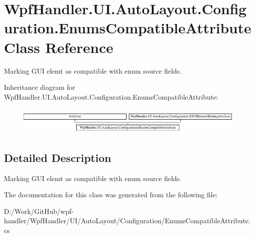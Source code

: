 \hypertarget{class_wpf_handler_1_1_u_i_1_1_auto_layout_1_1_configuration_1_1_enums_compatible_attribute}{}\section{Wpf\+Handler.\+U\+I.\+Auto\+Layout.\+Configuration.\+Enums\+Compatible\+Attribute Class Reference}
\label{class_wpf_handler_1_1_u_i_1_1_auto_layout_1_1_configuration_1_1_enums_compatible_attribute}


Marking G\+UI elemt as compatible with enum source fields.  


Inheritance diagram for Wpf\+Handler.\+U\+I.\+Auto\+Layout.\+Configuration.\+Enums\+Compatible\+Attribute\+:\begin{figure}[H]
\begin{center}
\leavevmode
\includegraphics[height=1.365854cm]{dd/db3/class_wpf_handler_1_1_u_i_1_1_auto_layout_1_1_configuration_1_1_enums_compatible_attribute}
\end{center}
\end{figure}


\subsection{Detailed Description}
Marking G\+UI elemt as compatible with enum source fields. 



The documentation for this class was generated from the following file\+:\begin{DoxyCompactItemize}
\item 
D\+:/\+Work/\+Git\+Hub/wpf-\/handler/\+Wpf\+Handler/\+U\+I/\+Auto\+Layout/\+Configuration/Enums\+Compatible\+Attribute.\+cs\end{DoxyCompactItemize}
